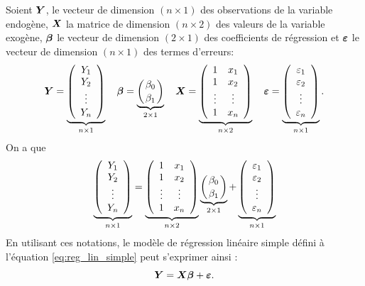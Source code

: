 Soient $\mbox{\boldmath$Y$\unboldmath}$, le vecteur de dimension $(n\times 1)$ des observations de la variable endogène, $\mbox{\boldmath$X$\unboldmath}$ la matrice de dimension $(n\times 2)$ des valeurs de la variable exogène, $\mbox{\boldmath$\beta$}$ le vecteur de dimension $(2\times 1)$ des coefficients de régression et $\mbox{\boldmath$\varepsilon$\unboldmath}$ le vecteur de dimension $(n \times 1)$ des termes d'erreurs:
$$
\mbox{\boldmath$Y$\unboldmath}=\underbrace{\left(\begin{array}{c} Y_1\\ Y_2\\ \vdots\\ Y_n\end{array}\right)}_{n\times 1}
\ \ \ \mbox{\boldmath$\beta$}=\underbrace{\left({\beta_0\atop\beta_1}\right)}_{2 \times 1}\ \ \
\mbox{\boldmath$X$\unboldmath}=\underbrace{\left(\begin{array}{cc} 1 & x_1\\ 1 & x_2\\ \vdots & \vdots \\
1 & x_n\end{array}\right)}_{n\times 2}\ \ \
\mbox{\boldmath$\varepsilon$\unboldmath}=\underbrace{\left(\begin{array}{c}\varepsilon_1\\ \varepsilon_2\\ \vdots\\
\varepsilon_n\end{array}\right)}_{n\times 1}.
$$
On a que
$$\underbrace{\left(\begin{array}{c} Y_1\\ Y_2\\ \vdots\\ Y_n\end{array}\right)}_{n\times 1}=\underbrace{\left(\begin{array}{cc} 1 & x_1\\ 1 & x_2\\ \vdots & \vdots \\
1 & x_n\end{array}\right)}_{n\times 2} \underbrace{\left({\beta_0\atop\beta_1}\right)}_{2 \times 1}+\underbrace{\left(\begin{array}{c}\varepsilon_1\\ \varepsilon_2\\ \vdots\\
\varepsilon_n\end{array}\right)}_{n\times 1}
$$
En utilisant ces notations, le modèle de régression linéaire simple défini à l'équation \eqref{eq:reg_lin_simple} peut s'exprimer ainsi :
\begin{equation}\label{eq:rlsmat}
\mbox{\boldmath$Y$\unboldmath}=\mbox{\boldmath$X$\unboldmath}\mbox{\boldmath$\beta$}+\mbox{\boldmath$\varepsilon$\unboldmath}.
\end{equation}

